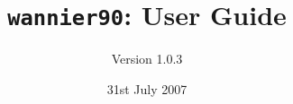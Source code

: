 \documentclass[a4paper,11pt,twoside]{book}
\title{{\tt wannier90}: User Guide}
\author{Version 1.0.3}
\date{31st July 2007}
\begin{document}
\newcommand{\wannier}{\texttt{wannier90}}
\newcommand{\pwscf}{\textsc{pwscf}}
\newcommand{\QE}{\textsc{quantum-espresso}}
\newcommand{\Mkb}{\mathbf{M}^{(\mathbf{k},\mathbf{b})}}
\newcommand{\Ak}{\mathbf{A}^{(\mathbf{k})}}
\newcommand{\Uk}{\mathbf{U}^{(\mathbf{k})}}
\newcommand{\cond}{\item[$\star$]}

\maketitle




















%
\end{document}
